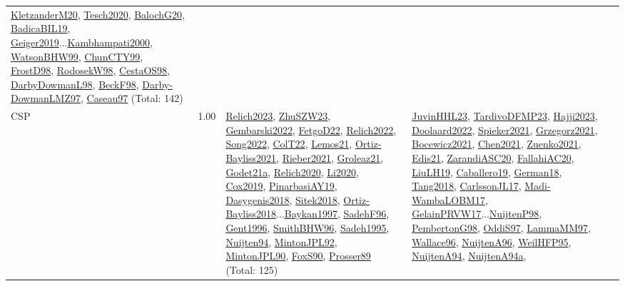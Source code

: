 {\begin{longtable}{p{3cm}r>{\raggedright\arraybackslash}p{6cm}>{\raggedright\arraybackslash}p{6cm}>{\raggedright\arraybackslash}p{8cm}}
\hyperref[detail:KletzanderM20]{KletzanderM20}, \hyperref[detail:Tesch2020]{Tesch2020}, \hyperref[detail:BalochG20]{BalochG20}, \hyperref[detail:BadicaBIL19]{BadicaBIL19}, \hyperref[detail:Geiger2019]{Geiger2019}...\hyperref[detail:Kambhampati2000]{Kambhampati2000}, \hyperref[detail:WatsonBHW99]{WatsonBHW99}, \hyperref[detail:ChunCTY99]{ChunCTY99}, \hyperref[detail:FrostD98]{FrostD98}, \hyperref[detail:RodosekW98]{RodosekW98}, \hyperref[detail:CestaOS98]{CestaOS98}, \hyperref[detail:DarbyDowmanL98]{DarbyDowmanL98}, \hyperref[detail:BeckF98]{BeckF98}, \hyperref[detail:Darby-DowmanLMZ97]{Darby-DowmanLMZ97}, \hyperref[detail:Caseau97]{Caseau97} (Total: 142)\\
\index{CSP}\index{CP!CSP}CSP &  1.00 & \hyperref[detail:Relich2023]{Relich2023}, \hyperref[detail:ZhuSZW23]{ZhuSZW23}, \hyperref[detail:Gembarski2022]{Gembarski2022}, \hyperref[detail:FetgoD22]{FetgoD22}, \hyperref[detail:Relich2022]{Relich2022}, \hyperref[detail:Song2022]{Song2022}, \hyperref[detail:ColT22]{ColT22}, \hyperref[detail:Lemos21]{Lemos21}, \hyperref[detail:Ortiz-Bayliss2021]{Ortiz-Bayliss2021}, \hyperref[detail:Rieber2021]{Rieber2021}, \hyperref[detail:Groleaz21]{Groleaz21}, \hyperref[detail:Godet21a]{Godet21a}, \hyperref[detail:Relich2020]{Relich2020}, \hyperref[detail:Li2020]{Li2020}, \hyperref[detail:Cox2019]{Cox2019}, \hyperref[detail:PinarbasiAY19]{PinarbasiAY19}, \hyperref[detail:Dasygenis2018]{Dasygenis2018}, \hyperref[detail:Sitek2018]{Sitek2018}, \hyperref[detail:Ortiz-Bayliss2018]{Ortiz-Bayliss2018}...\hyperref[detail:Baykan1997]{Baykan1997}, \hyperref[detail:SadehF96]{SadehF96}, \hyperref[detail:Gent1996]{Gent1996}, \hyperref[detail:SmithBHW96]{SmithBHW96}, \hyperref[detail:Sadeh1995]{Sadeh1995}, \hyperref[detail:Nuijten94]{Nuijten94}, \hyperref[detail:MintonJPL92]{MintonJPL92}, \hyperref[detail:MintonJPL90]{MintonJPL90}, \hyperref[detail:FoxS90]{FoxS90}, \hyperref[detail:Prosser89]{Prosser89} (Total: 125) & \hyperref[detail:JuvinHHL23]{JuvinHHL23}, \hyperref[detail:TardivoDFMP23]{TardivoDFMP23}, \hyperref[detail:Hajji2023]{Hajji2023}, \hyperref[detail:Doolaard2022]{Doolaard2022}, \hyperref[detail:Spieker2021]{Spieker2021}, \hyperref[detail:Grzegorz2021]{Grzegorz2021}, \hyperref[detail:Bocewicz2021]{Bocewicz2021}, \hyperref[detail:Chen2021]{Chen2021}, \hyperref[detail:Zuenko2021]{Zuenko2021}, \hyperref[detail:Edis21]{Edis21}, \hyperref[detail:ZarandiASC20]{ZarandiASC20}, \hyperref[detail:FallahiAC20]{FallahiAC20}, \hyperref[detail:LiuLH19]{LiuLH19}, \hyperref[detail:Caballero19]{Caballero19}, \hyperref[detail:German18]{German18}, \hyperref[detail:Tang2018]{Tang2018}, \hyperref[detail:CarlssonJL17]{CarlssonJL17}, \hyperref[detail:Madi-WambaLOBM17]{Madi-WambaLOBM17}, \hyperref[detail:GelainPRVW17]{GelainPRVW17}...\hyperref[detail:NuijtenP98]{NuijtenP98}, \hyperref[detail:PembertonG98]{PembertonG98}, \hyperref[detail:OddiS97]{OddiS97}, \hyperref[detail:LammaMM97]{LammaMM97}, \hyperref[detail:Wallace96]{Wallace96}, \hyperref[detail:NuijtenA96]{NuijtenA96}, \hyperref[detail:WeilHFP95]{WeilHFP95}, \hyperref[detail:NuijtenA94]{NuijtenA94}, \hyperref[detail:NuijtenA94a]{NuijtenA94a}, 
\end{longtable}}
